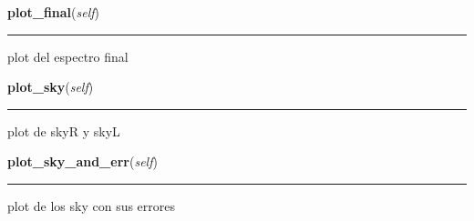     \label{spectro_metria_g:spect:plot_final}

    \vspace{0.5ex}

\hspace{.8\funcindent}\begin{boxedminipage}{\funcwidth}

    \raggedright \textbf{plot\_final}(\textit{self})

    \vspace{-1.5ex}

    \rule{\textwidth}{0.5\fboxrule}
\setlength{\parskip}{2ex}
    plot del espectro final

\setlength{\parskip}{1ex}
    \end{boxedminipage}

    \label{spectro_metria_g:spect:plot_sky}

    \vspace{0.5ex}

\hspace{.8\funcindent}\begin{boxedminipage}{\funcwidth}

    \raggedright \textbf{plot\_sky}(\textit{self})

    \vspace{-1.5ex}

    \rule{\textwidth}{0.5\fboxrule}
\setlength{\parskip}{2ex}
    plot de skyR y skyL

\setlength{\parskip}{1ex}
    \end{boxedminipage}

    \label{spectro_metria_g:spect:plot_sky_and_err}

    \vspace{0.5ex}

\hspace{.8\funcindent}\begin{boxedminipage}{\funcwidth}

    \raggedright \textbf{plot\_sky\_and\_err}(\textit{self})

    \vspace{-1.5ex}

    \rule{\textwidth}{0.5\fboxrule}
\setlength{\parskip}{2ex}
    plot de los sky con sus errores

\setlength{\parskip}{1ex}
    \end{boxedminipage}

